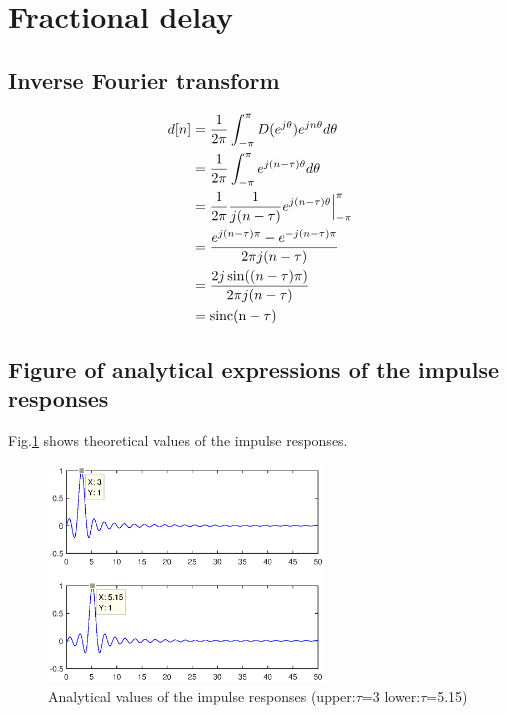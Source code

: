 \documentclass[onecolumn, conference]{IEEEtran}
\begin{document}
\section{Fractional delay}

\subsection{Inverse Fourier transform}

\begin{equation}
\begin{aligned}
d[n]&= \frac{1}{2\pi}\int_{-\pi}^{\pi}D(e^{j\theta})e^{jn\theta}d\theta \\
 &= \frac{1}{2\pi}\int_{-\pi}^{\pi}e^{j(n-\tau)\theta}d\theta \\
 &= \frac{1}{2\pi} \frac{1}{j(n-\tau)} e^{j(n-\tau)\theta} \Big|_{-\pi}^{\pi} \\
 &= \frac{e^{j(n-\tau)\pi}-e^{-j(n-\tau)\pi}}{2\pi j(n-\tau)} \\ 
 &= \frac{2j\sin((n-\tau)\pi)}{2\pi j(n-\tau)} \\
 &= \rm{sinc}(n-\tau)
\end{aligned}
\label{eq}
\end{equation}

\subsection{Figure of analytical expressions of the impulse responses}

Fig.\ref{Analytical values of the impulse responses} shows theoretical values of the impulse responses.

\begin{figure}[htbp]
	\centerline{\includegraphics[width=0.65\textwidth]{img/2_b_2.eps}}
	\caption{Analytical values of the impulse responses (upper:\(\tau \)=3 lower:\(\tau \)=5.15)}
	\label{Analytical values of the impulse responses}
\end{figure}
\end{document}
